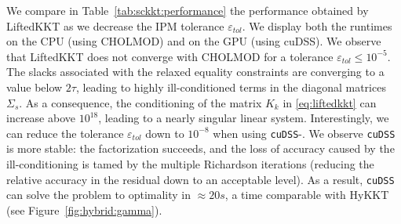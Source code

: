 We compare in Table~\ref{tab:sckkt:performance} the performance obtained by LiftedKKT
as we decrease the IPM tolerance $\varepsilon_{tol}$.
We display both the runtimes on the CPU (using CHOLMOD) and on the GPU (using cuDSS).
We observe that LiftedKKT does not converge with CHOLMOD for a tolerance $\varepsilon_{tol} \leq 10^{-5}$.
The slacks associated with the relaxed equality constraints are converging to a value below $2 \tau$,
leading to highly ill-conditioned terms in the diagonal matrices $\Sigma_s$.
As a consequence, the conditioning of the matrix $K_k$ in \eqref{eq:liftedkkt} can increase
above $10^{18}$, leading to a nearly singular linear system. Interestingly,
we can reduce the tolerance $\varepsilon_{tol}$ down to $10^{-8}$ when using {\tt cuDSS}-\ldlt.
We observe {\tt cuDSS} is more stable: the factorization
succeeds, and the loss of accuracy caused by the ill-conditioning is tamed by the multiple
Richardson iterations (reducing the relative accuracy in the residual down to an acceptable level).
As a result, {\tt cuDSS} can solve
the problem to optimality in $\approx 20s$, a time comparable with HyKKT (see Figure~\ref{fig:hybrid:gamma}).

\begin{table}[!ht]
  \centering
  \label{tab:sckkt:performance}
  \caption{Performance of the equality-relaxation
    strategy as we decrease the IPM tolerance $\varepsilon_{tol}$.
    The table displays the wall time on the CPU (using CHOLMOD)
    and on the GPU (using cuDSS-\ldlt). (A30 GPU)
  }
\end{table}

